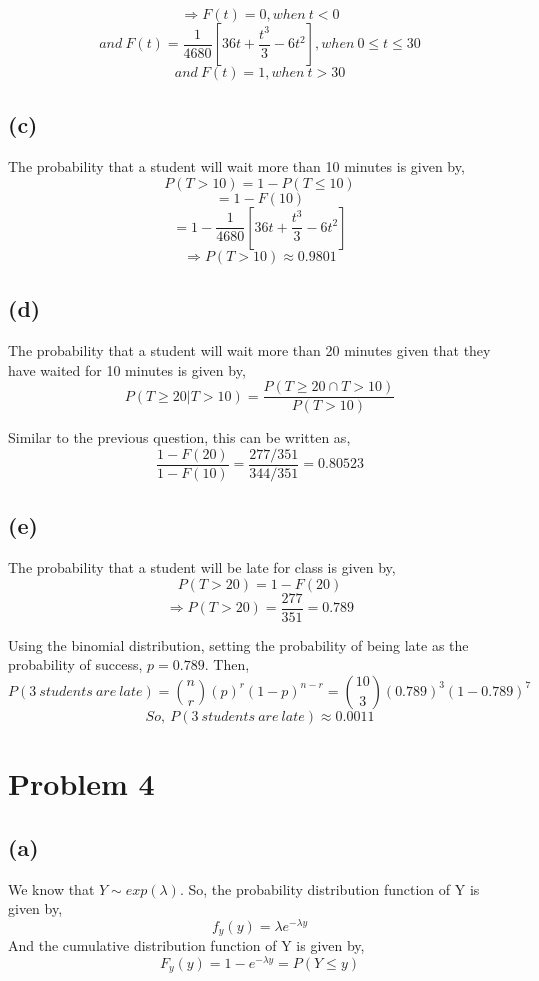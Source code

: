 \documentclass{article}
\begin{document}
			$$ \Rightarrow F(t) = 0, when\ t < 0 $$
			$$ and\ F(t) =  \frac{1}{4680} \left[ 36t+ \frac{t^3}{3} -6 t^2 \right], when\ 0 \leq t \leq 30 $$
			$$ and\ F(t) = 1, when\ t > 30 $$

		\subsection*{(c)}
			The probability that a student will wait more than 10 minutes is given by,
			$$ P(T > 10) = 1 - P( T \leq 10) $$
			$$ = 1 - F(10) $$
			$$ = 1 - \frac{1}{4680} \left[ 36t+ \frac{t^3}{3} -6 t^2 \right] $$
			$$ \Rightarrow P(T>10) \approx 0.9801 $$

		\subsection*{(d)}
			The probability that a student will wait more than 20 minutes given that they have waited for 10 minutes is given by,
			$$ P(T \geq 20 | T>10) = \frac{P(T \geq 20 \cap T > 10)}{P(T>10)} $$

			Similar to the previous question, this can be written as,
			$$ \frac{1-F(20)}{1-F(10)} = \frac{277/351}{344/351} = 0.80523 $$

		\subsection*{(e)}
			The probability that a student will be late for class is given by,
			$$ P(T>20) = 1-F(20) $$
			$$ \Rightarrow P(T>20) = \frac{277}{351} = 0.789 $$

			Using the binomial distribution, setting the probability of being late as the probability of success, $p=0.789$.
			Then,
			$$ P(3\ students\ are\ late) = {n \choose r} (p)^r (1-p)^{n-r} = {10 \choose 3} (0.789)^3 (1-0.789)^7 $$
			$$ So,\ P(3\ students\ are\ late) \approx 0.0011 $$

	\section*{Problem 4}
		\subsection*{(a)}
			We know that $Y \sim exp(\lambda)$. So, the probability distribution function of Y is given by,
			$$ f_y(y) = \lambda e^{-\lambda y} $$
			And the cumulative distribution function of Y is given by,
			$$ F_y(y) = 1-e^{-\lambda y} = P(Y \leq y) $$
			
\end{document}
